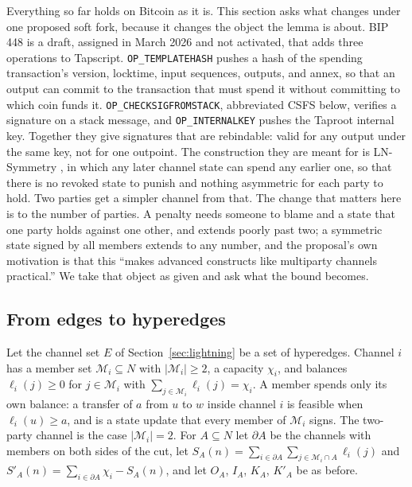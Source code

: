 \documentclass[11pt]{article}
\theoremstyle{plain}
\theoremstyle{definition}
\theoremstyle{remark}
\begin{document}
Everything so far holds on Bitcoin as it is. This section asks what changes under one proposed soft fork, because it changes the object the lemma is about. BIP 448 \citep{bip448} is a draft, assigned in March 2026 and not activated, that adds three operations to Tapscript. \texttt{OP\_TEMPLATEHASH} \citep{bip446} pushes a hash of the spending transaction's version, locktime, input sequences, outputs, and annex, so that an output can commit to the transaction that must spend it without committing to which coin funds it. \texttt{OP\_CHECKSIGFROMSTACK}, abbreviated CSFS below, verifies a signature on a stack message, and \texttt{OP\_INTERNALKEY} pushes the Taproot internal key. Together they give signatures that are rebindable: valid for any output under the same key, not for one outpoint. The construction they are meant for is LN-Symmetry \citep{decker2018eltoo,optech-eltoo}, in which any later channel state can spend any earlier one, so that there is no revoked state to punish and nothing asymmetric for each party to hold. Two parties get a simpler channel from that. The change that matters here is to the number of parties. A penalty needs someone to blame and a state that one party holds against one other, and extends poorly past two; a symmetric state signed by all members extends to any number, and the proposal's own motivation is that this ``makes advanced constructs like multiparty channels practical.'' We take that object as given and ask what the bound becomes.

\subsection{From edges to hyperedges}

Let the channel set $E$ of Section~\ref{sec:lightning} be a set of hyperedges. Channel $i$ has a member set $\mathcal M_i\subseteq N$ with $|\mathcal M_i|\ge 2$, a capacity $\chi_i$, and balances $\ell_i(j)\ge 0$ for $j\in\mathcal M_i$ with $\sum_{j\in\mathcal M_i}\ell_i(j)=\chi_i$. A member spends only its own balance: a transfer of $a$ from $u$ to $w$ inside channel $i$ is feasible when $\ell_i(u)\ge a$, and is a state update that every member of $\mathcal M_i$ signs. The two-party channel is the case $|\mathcal M_i|=2$. For $A\subseteq N$ let $\partial A$ be the channels with members on both sides of the cut, let $S_A(n)=\sum_{i\in\partial A}\sum_{j\in\mathcal M_i\cap A}\ell_i(j)$ and $S'_A(n)=\sum_{i\in\partial A}\chi_i-S_A(n)$, and let $O_A$, $I_A$, $K_A$, $K'_A$ be as before.
\end{document}
